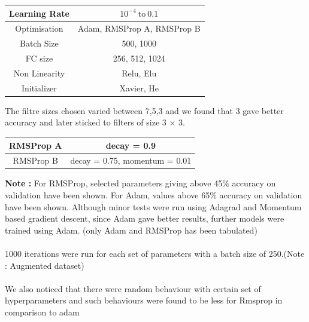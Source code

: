 \documentclass[12pt]{report}
\begin{document}
\begin{table}[H]
	\label{T:equipos}
	\begin{center}
		\begin{tabular}{| c | c |}
            \hline
            Learning Rate & $10^{-4} \ \textrm{to} \ 0.1$ \\
            \hline
            Optimisation & Adam, RMSProp A, RMSProp B \\
            \hline
            Batch Size & 500, 1000 \\
            \hline
            FC size & 256, 512, 1024 \\
            \hline
            Non Linearity & Relu, Elu \\
            \hline
            Initializer & Xavier, He \\
            \hline
		\end{tabular}
	\end{center}
\end{table}

The filtre sizes chosen varied between 7,5,3 and we found that 3 gave better accuracy and later sticked to filters of size 3 $\times$ 3.

\begin{table}[H]
	\label{T:equipos}
	\begin{center}
		\begin{tabular}{| c | c |}
            \hline
            RMSProp A & decay = 0.9 \\
            \hline
            RMSProp B & decay = 0.75, momentum = 0.01 \\
            \hline
		\end{tabular}
	\end{center}
\end{table}

\textbf{Note : } For RMSProp, selected parameters giving above 45$\%$ accuracy on validation have been shown. For Adam, values above 65$\%$ accuracy on validation have been shown. Although minor tests were run using Adagrad and Momentum based gradient descent, since Adam gave better results, further models were trained using Adam. (only Adam and RMSProp has been tabulated)\\\\
1000 iterations were run for each set of parameters with a batch size of 250.(Note : Augmented dataset)\\\\
We also noticed that there were random behaviour with certain set of hyperparameters and such behaviours were found to be less for Rmsprop in comparison to adam
 
\end{document}
